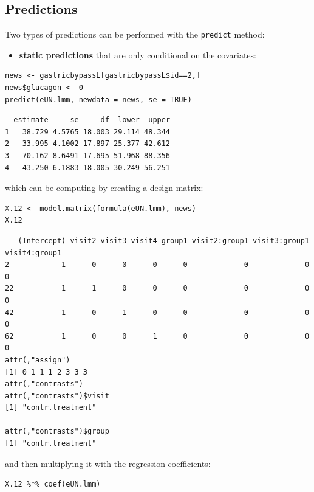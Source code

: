 \documentclass[12pt]{article}
\begin{document}
\clearpage

\subsection{Predictions}
\label{sec:org69cec6e}

Two types of predictions can be performed with the \texttt{predict} method:
\begin{itemize}
\item \textbf{static predictions} that are only conditional on the covariates:
\end{itemize}
\lstset{language=r,label= ,caption= ,captionpos=b,numbers=none}
\begin{lstlisting}
news <- gastricbypassL[gastricbypassL$id==2,]
news$glucagon <- 0
predict(eUN.lmm, newdata = news, se = TRUE)
\end{lstlisting}

\begin{verbatim}
  estimate     se     df  lower  upper
1   38.729 4.5765 18.003 29.114 48.344
2   33.995 4.1002 17.897 25.377 42.612
3   70.162 8.6491 17.695 51.968 88.356
4   43.250 6.1883 18.005 30.249 56.251
\end{verbatim}


which can be computing by creating a design matrix:
\lstset{language=r,label= ,caption= ,captionpos=b,numbers=none}
\begin{lstlisting}
X.12 <- model.matrix(formula(eUN.lmm), news)
X.12
\end{lstlisting}

\begin{verbatim}
   (Intercept) visit2 visit3 visit4 group1 visit2:group1 visit3:group1 visit4:group1
2            1      0      0      0      0             0             0             0
22           1      1      0      0      0             0             0             0
42           1      0      1      0      0             0             0             0
62           1      0      0      1      0             0             0             0
attr(,"assign")
[1] 0 1 1 1 2 3 3 3
attr(,"contrasts")
attr(,"contrasts")$visit
[1] "contr.treatment"

attr(,"contrasts")$group
[1] "contr.treatment"
\end{verbatim}

and then multiplying it with the regression coefficients:
\lstset{language=r,label= ,caption= ,captionpos=b,numbers=none}
\begin{lstlisting}
X.12 %*% coef(eUN.lmm)
\end{lstlisting}
\end{document}
